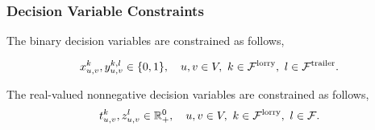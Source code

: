 %
%
%
%
%
%
%
%


\subsubsection{Decision Variable Constraints}

The binary decision variables are constrained as follows,

\begin{align}
x^k_{u,v}, y^{k,l}_{u,v} \in \{ 0,1 \} ,
\quad u,v \in V,
\ k \in \mathcal{F}^{\rm lorry},
\ l \in \mathcal{F}^{\rm trailer}.
\end{align}

The real-valued nonnegative decision variables are constrained as follows,
\begin{align}
\label{con:last}
t^k_{u,v}, z^{l}_{u,v} \in \mathbb{R}^0_+,
\quad u,v \in V,
\ k \in \mathcal{F}^{\rm lorry},
\ l \in \mathcal{F}.
\end{align}

